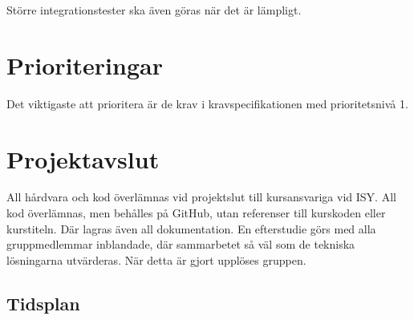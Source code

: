 \documentclass[a4paper,titlepage,12pt]{article}
\begin{document}
	Större integrationstester ska även göras när det är lämpligt.
	
	\section{Prioriteringar}
    Det viktigaste att prioritera är de krav i kravspecifikationen med
    prioritetsnivå 1.
	
	
	\section{Projektavslut}
	All hårdvara och kod överlämnas vid projektslut till kursansvariga vid ISY. All 
	kod överlämnas, men behålles på GitHub, utan referenser till kurskoden eller 
	kurstiteln. Där lagras även all dokumentation. En efterstudie görs med alla 
	gruppmedlemmar inblandade, där sammarbetet så väl som de tekniska lösningarna 
	utvärderas. När detta är gjort upplöses gruppen.

\begin{appendices}
	\section{Tidsplan\label{app:tidsplan}}
\end{appendices}
\end{document}
